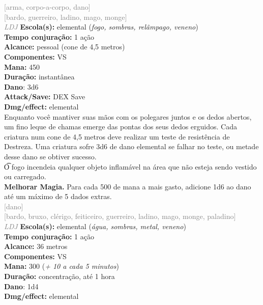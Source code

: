 \documentclass{RPG_Adventure}[2021/10/20]
\begin{document}
{\scriptsize \textcolor{gray}{[arma, corpo-a-corpo, dano]\\}}
{\scriptsize \textcolor{gray}{[bardo, guerreiro, ladino, mago, monge]\\}}
{\tiny \textcolor{gray}{\textit{LDJ}}}\jump{}
{\small \t \textbf{Escola(s):} elemental (\textit{fogo, sombras, relâmpago, veneno})\\\t \textbf{Tempo conjuração:} 1 ação\\\t \textbf{Alcance:} pessoal (cone de 4,5 metros)\\\t \textbf{Componentes:} VS\\\t \textbf{Mana:} 450\\\t \textbf{Duração:} instantânea\\\t \textbf{Dano}: 3d6\\\t \textbf{Attack/Save:} DEX Save\\\t \textbf{Dmg/effect:} elemental\\}
{\normalsize Enquanto você mantiver suas mãos com os polegares juntos e os dedos abertos, um fino leque de chamas emerge das pontas dos seus dedos erguidos. Cada criatura num cone de 4,5 metros deve realizar um teste de resistência de Destreza. Uma criatura sofre 3d6 de dano elemental se falhar no teste, ou metade desse dano se obtiver sucesso.\\\t O fogo incendeia qualquer objeto inflamável na área que não esteja sendo vestido ou carregado.\\\t \textbf{Melhorar Magia.} Para cada 500 de mana a mais gasto, adicione 1d6 ao dano até um máximo de 5 dados extras.\\}
{\scriptsize \textcolor{gray}{[dano]\\}}
{\scriptsize \textcolor{gray}{[bardo, bruxo, clérigo, feiticeiro, guerreiro, ladino, mago, monge, paladino]\\}}
{\tiny \textcolor{gray}{\textit{LDJ}}}\jump{}
{\small \t \textbf{Escola(s):} elemental (\textit{água, sombras, metal, veneno})\\\t \textbf{Tempo conjuração:} 1 ação\\\t \textbf{Alcance:} 36 metros\\\t \textbf{Componentes:} VS\\\t \textbf{Mana:} 300 (\textit{+ 10 a cada 5 minutos})\\\t \textbf{Duração:} concentração, até 1 hora\\\t \textbf{Dano}: 1d4\\\t \textbf{Dmg/effect:} elemental\\}
\end{document}
